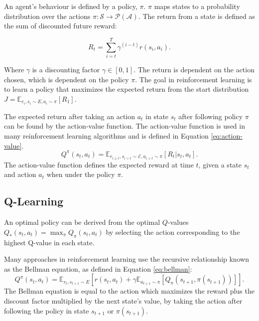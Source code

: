 An agent's behaviour is defined by a policy, $\pi$. $\pi$ maps states to a probability distribution over the actions $\pi:\mathcal{S}\rightarrow \mathcal{P}(\mathcal{A})$. The return from a state is defined as the sum of discounted future reward:

\begin{equation}
R_t=\sum_{i=t}^T\gamma^{(i-t)}r(s_i,a_i).
\end{equation}

Where $\gamma$ is a discounting factor $\gamma \in [0,1]$. The return is dependent on the action chosen, which is dependent on the policy $\pi$. The goal in reinforcement learning is to learn a policy that maximizes the expected return from the start distribution $J=\mathbb{E}_{r_i,s_i \sim E,a_i \sim \pi}[R_1]$. 

The expected return after taking an action $a_t$ in state $s_t$ after following policy $\pi$ can be found by the action-value function. The action-value function is used in many reinforcement learning algorithms and is defined in Equation \ref{eq:action-value}.
\begin{equation}
\label{eq:action-value}
Q^{\pi}(s_t,a_t)=\mathbb{E}_{r_{i\geq t},s_{i>t}\sim \mathcal{E},a_{i>t}\sim\pi}[R_t|s_t,a_t].
\end{equation}
\noindent The action-value function defines the expected reward at time $t$, given a state $s_t$ and action $a_t$ when under the policy $\pi$.

\subsection{Q-Learning}

An optimal policy can be derived from the optimal $Q$-values $Q_*(s_t,a_t)=\max_\pi Q_\pi(s_t,a_t)$ by selecting the action corresponding to the highest Q-value in each state.

Many approaches in reinforcement learning use the recursive relationship known as the Bellman equation, as defined in Equation \ref{eq:bellman}:
\begin{dmath}
	\label{eq:bellman}
	Q^\pi(s_t,a_t)=\mathbb{E}_{{r_t},s_{t+1}\sim E} [r(s_t,a_t)+
	\gamma\mathbb{E}_{a_{t+1}\sim \pi}[Q_\pi(s_{t+1},\pi(s_{t+1}))]].
\end{dmath}
\noindent The Bellman equation is equal to the action which maximizes the reward plus the discount factor multiplied by the next state's value, by taking the action after following the policy in state $s_{t+1}$ or $\pi(s_{t+1})$.

